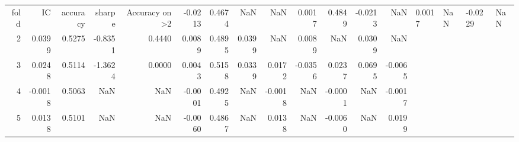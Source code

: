 \begin{tabular}{rrrrrrrrrrrrr}
\toprule
fold & IC & accuracy & sharpe & Accuracy on >2%
 & -0.0213 & 0.4674 & NaN & NaN & 0.0017 & 0.4849 & -0.0213 & NaN & 0.0017 & NaN & -0.0229 & NaN \\
2 & 0.0399 & 0.5275 & -0.8351 & 0.4440 & 0.0089 & 0.4895 & 0.0399 & NaN & 0.0089 & NaN & 0.0309 & NaN \\
3 & 0.0248 & 0.5114 & -1.3624 & 0.0000 & 0.0043 & 0.5158 & 0.0339 & 0.0172 & -0.0356 & 0.0237 & 0.0695 & -0.0065 \\
4 & -0.0018 & 0.5063 & NaN & NaN & -0.0001 & 0.4925 & NaN & -0.0018 & NaN & -0.0001 & NaN & -0.0017 \\
5 & 0.0138 & 0.5101 & NaN & NaN & -0.0060 & 0.4867 & NaN & 0.0138 & NaN & -0.0060 & NaN & 0.0199 \\
\bottomrule
\end{tabular}
